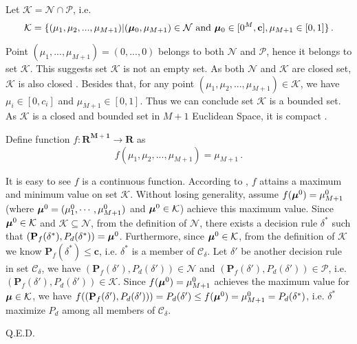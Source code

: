 Let $\mathcal{K} = \mathcal{N} \cap \mathcal{P}$, i.e.
\begin{equation}
\label{apr14a0}
\mathcal{K} = \{
(\mu_1, \mu_2, ..., \mu_{M+1}) | (\boldsymbol{\mu}_0, \mu_{M+1}) \in \mathcal{N} \text{ and } \boldsymbol{\mu}_0 \in [0^M, \mathbf{c}], \mu_{M+1} \in [0, 1]
\}\,.
\end{equation}

Point $(\mu_1, ..., \mu_{M+1}) = (0, ..., 0)$ belongs to both $\mathcal{N}$ and $\mathcal{P}$, hence it belongs to set $\mathcal{K}$. This suggests set $\mathcal{K}$ is not an empty set.
As both $\mathcal{N}$ and $\mathcal{K}$ are closed set, $\mathcal{K}$ is also closed \cite{rudin1964principles}. Besides that, for any point  $(\mu_1, \mu_2, ..., \mu_{M+1}) \in \mathcal{K}$, we have $\mu_i \in [0, c_i]$ and $\mu_{M+1} \in [0,1]$. Thus we can conclude set $\mathcal{K}$ is a bounded set. As $\mathcal{K}$ is a closed and bounded set in $M+1$ Euclidean Space, it is compact \cite{johnsonbaugh2012foundations}. 

Define function $f: \mathbf{R^{M+1}} \rightarrow \mathbf{R}$ as
\begin{equation}
f(\mu_1, \mu_2, ..., \mu_{M+1}) = \mu_{M+1}\,.
\end{equation}

It is easy to see $f$ is a continuous function. According to \cite{johnsonbaugh2012foundations}, $f$ attains a maximum and minimum value on set $\mathcal{K}$. 
Without losing generality, assume $f(\boldsymbol{\mu}^0)  = \mu_{M+1}^0$ (where $\boldsymbol{\mu}^0 = (\mu_1^0, \cdots, \mu_{M+1}^0)$ and $\boldsymbol{\mu}^0 \in \mathcal{K}$) achieve this maximum value. 
Since $\boldsymbol{\mu}^0 \in \mathcal{K}$ and $\mathcal{K}  \subseteq  \mathcal{N}$, from the definition of $\mathcal{N}$, there exists a decision rule $\delta^\ast$ such that $(\mathbf{P}_{f}(\delta^\ast), P_d(\delta^\ast)) = \boldsymbol{\mu}^0$.  
Furthermore, since $\boldsymbol{\mu}^0 \in \mathcal{K} $, from the definition of $\mathcal{K}$ we know $\mathbf{P}_{f}(\delta^\ast) \leq \mathbf{c}$, 
i.e. $\delta^\ast$ is a member of $\mathcal{C}_\delta$. 
Let $\delta' $ be another decision rule in set $\mathcal{C}_\delta$, we have $(\mathbf{P}_f(\delta'), P_d(\delta')) \in \mathcal{N}$ and $(\mathbf{P}_f(\delta'), P_d(\delta')) \in \mathcal{P}$, i.e. $(\mathbf{P}_f(\delta'), P_d(\delta')) \in \mathcal{K}$.
Since $f(\boldsymbol{\mu}^0) = \mu_{M+1}^0$ achieves the maximum value for $\boldsymbol{\mu} \in \mathcal{K}$, we have
$f((\mathbf{P}_f(\delta'), P_d(\delta')))  = P_d(\delta') \leq  f(\boldsymbol{\mu}^0) = \mu_{M+1}^0 =  P_d(\delta^\ast)$, i.e. $\delta^\ast$ maximize $P_d$ among all members of $\mathcal{C}_\delta$.

Q.E.D.
